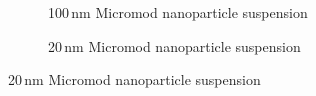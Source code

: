 \begin{figure}
	
            \begin{subfigure}{0.49\textwidth}
                  \flushleft
                  \caption{100\,nm Micromod nanoparticle suspension}\label{subfig:micromod_100nm_peak}
          \end{subfigure}\hfill
        \begin{subfigure}{0.49\textwidth}
                \flushright
                \caption{20\,nm Micromod nanoparticle suspension}\label{subfig:micromod_20nm_peak}

\end{subfigure}
\end{figure}
